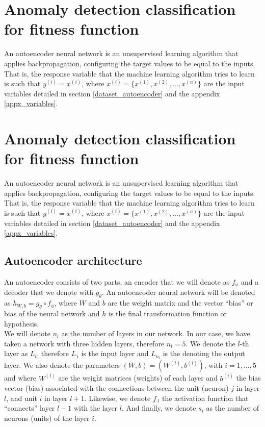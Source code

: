 \documentclass{iosart2c}
\begin{document}
\section{Anomaly detection classification for fitness function}\label{autoencoder_section}

An autoencoder neural network is an unsupervised learning algorithm that applies backpropagation, configuring the target values to be equal to the inputs. That is, the response variable that the machine learning algorithm tries to learn is such that $y^{(i)} = x^{(i)} $, where $x^{(i)} = \{x^{(1)}, x^{(2)}, \ldots, x^{(n)} \} $ are the input variables detailed in section \ref{dataset_autoencoder} and the appendix \ref{appx_variables}.\\

\section{Anomaly detection classification for fitness function}\label{autoencoder_section}

An autoencoder neural network is an unsupervised learning algorithm that applies backpropagation, configuring the target values to be equal to the inputs. That is, the response variable that the machine learning algorithm tries to learn is such that $y^{(i)} = x^{(i)} $, where $x^{(i)} = \{x^{(1)}, x^{(2)}, \ldots, x^{(n)} \} $ are the input variables detailed in section \ref{dataset_autoencoder} and the appendix \ref{appx_variables}.\\

\subsection{Autoencoder architecture}\label{autoencoder_architecture}

An autoencoder consists of two parts, an encoder that we will denote as $ f_{\phi} $ and a decoder that we denote with $ g_{\theta} $. An autoencoder neural network will be denoted as $ h_{W, b} = g_\theta \circ f_\phi$, where $W$ and $b$ are the weight matrix and the vector ``bias'' or bias of the neural network and $h$ is the final transformation function or hypothesis. \\

We will denote $n_l$ as the number of layers in our network. In our case, we have taken a network with three hidden layers, therefore $n_l=5$. We denote the $l$-th layer as $L_l$, therefore $L_1$ is the input layer and $L_{n_l}$ is the denoting the output layer. We also denote the parameters $(W,b)=(W^{(i)},b^{(i)})$, with $i=1,\ldots,5$ and where $W^{(l)}$ are the weight matrices (weights) of each layer and $b^{(i)}$ the bias vector (bias) associated with the connections between the unit (neuron) $j$ in layer $l$, and unit $i$ in layer $l+1$. Likewise, we denote $f_{\cdot l}$ the activation function that ``connects'' layer $l-1$ with the layer $l$. And finally, we denote $s_i$ as the number of neurons (units) of the layer $i$. \\
\end{document}
